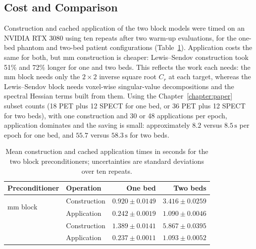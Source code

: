 \subsection{Cost and Comparison}

Construction and cached application of the two block models were timed on an NVIDIA RTX 3080 using ten repeats after two warm-up evaluations, for the one-bed phantom and two-bed patient configurations (Table~\ref{tab:mm_preconditioner_cost}). Application costs the same for both, but \gls{mm} construction is cheaper: Lewis--Sendov construction took 51\% and 72\% longer for one and two beds. This reflects the work each needs: the \gls{mm} block needs only the $2\times2$ inverse square root $C_r$ at each target, whereas the Lewis--Sendov block needs voxel-wise singular-value decompositions and the spectral Hessian terms built from them. Using the Chapter~\ref{chapter:paper} subset counts (18 PET plus 12 SPECT for one bed, or 36 PET plus 12 SPECT for two beds), with one construction and 30 or 48 applications per epoch, application dominates and the saving is small: approximately $8.2$ versus $8.5\,\mathrm{s}$ per epoch for one bed, and $55.7$ versus $58.3\,\mathrm{s}$ for two beds.

\begin{table}[htbp]
    \centering
    \caption{Mean construction and cached application times in seconds for the two block preconditioners; uncertainties are standard deviations over ten repeats.}
    \label{tab:mm_preconditioner_cost}
    \small
    \begin{tabular}{@{}llrr@{}}
        \toprule
        Preconditioner & Operation & One bed & Two beds\\
        \midrule
        \multirow{2}{*}{\gls{mm} block}
            & Construction & $0.920 \pm 0.0149$ & $3.416 \pm 0.0259$\\
            & Application  & $0.242 \pm 0.0019$ & $1.090 \pm 0.0046$\\
        \addlinespace
        \multirow{2}{*}{Lewis--Sendov block}
            & Construction & $1.389 \pm 0.0141$ & $5.867 \pm 0.0395$\\
            & Application  & $0.237 \pm 0.0011$ & $1.093 \pm 0.0052$\\
        \bottomrule
    \end{tabular}
\end{table}

